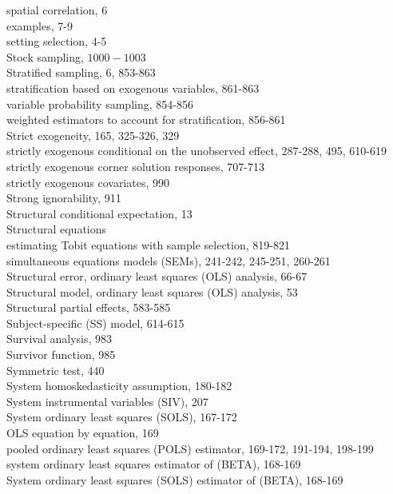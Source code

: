 \documentclass[10pt]{article}
\begin{document}
spatial correlation, 6\\
examples, 7-9\\
setting selection, 4-5\\
Stock sampling, $1000-1003$\\
Stratified sampling, 6, 853-863\\
stratification based on exogenous variables, 861-863\\
variable probability sampling, 854-856\\
weighted estimators to account for stratification, 856-861\\
Strict exogeneity, 165, 325-326, 329\\
strictly exogenous conditional on the unobserved effect, 287-288, 495, 610-619\\
strictly exogenous corner solution responses, 707-713\\
strictly exogenous covariates, 990\\
Strong ignorability, 911\\
Structural conditional expectation, 13\\
Structural equations\\
estimating Tobit equations with sample selection, 819-821\\
simultaneous equations models (SEMs), 241-242, 245-251, 260-261\\
Structural error, ordinary least squares (OLS) analysis, 66-67\\
Structural model, ordinary least squares (OLS) analysis, 53\\
Structural partial effects, 583-585\\
Subject-specific (SS) model, 614-615\\
Survival analysis, 983\\
Survivor function, 985\\
Symmetric test, 440\\
System homoskedasticity assumption, 180-182\\
System instrumental variables (SIV), 207\\
System ordinary least squares (SOLS), 167-172\\
OLS equation by equation, 169\\
pooled ordinary least squares (POLS) estimator, 169-172, 191-194, 198-199\\
system ordinary least squares estimator of (BETA), 168-169\\
System ordinary least squares (SOLS) estimator of (BETA), 168-169\\
\end{document}
